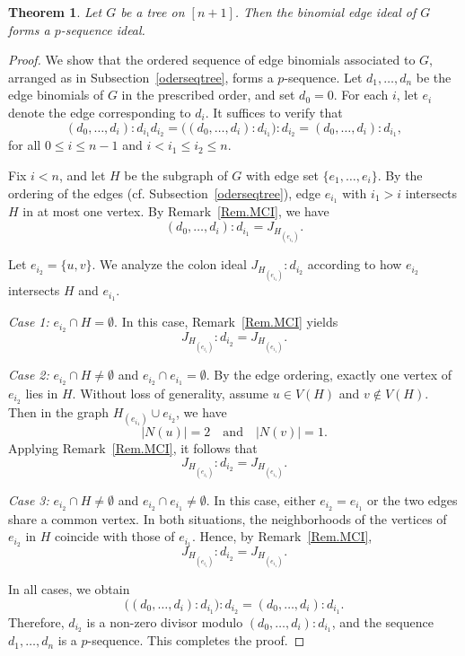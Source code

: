\documentclass[11pt,a4paper,reqno]{amsart}
\newtheorem{theorem}{Theorem}[section]
\theoremstyle{definition}
\begin{document}
\begin{theorem}\label{thm.pseqtree}
Let \(G\) be a tree on \([n+1]\). Then the binomial edge ideal of \(G\) forms a \(p\)-sequence ideal.
\end{theorem}

\begin{proof}
We show that the ordered sequence of edge binomials associated to \(G\), arranged as in Subsection~\ref{oderseqtree}, forms a \(p\)-sequence. Let \(d_1,\ldots,d_n\) be the edge binomials of \(G\) in the prescribed order, and set \(d_0=0\). For each \(i\), let \(e_i\) denote the edge corresponding to \(d_i\). It suffices to verify that
\[
(d_0,\ldots,d_i):d_{i_1}d_{i_2}
=
\big((d_0,\ldots,d_i):d_{i_1}\big):d_{i_2}
=
(d_0,\ldots,d_i):d_{i_1},
\]
for all \(0 \le i \le n-1\) and \(i < i_1 \le i_2 \le n\).

Fix \(i < n\), and let \(H\) be the subgraph of \(G\) with edge set \(\{e_1,\ldots,e_i\}\). By the ordering of the edges (cf. Subsection~\ref{oderseqtree}), edge \(e_{i_1}\) with \(i_1>i\) intersects \(H\) in at most one vertex. By Remark~\ref{Rem.MCI}, we have
\[
(d_0,\ldots,d_i):d_{i_1} = J_{H_{(e_{i_1})}}.
\]

Let \(e_{i_2}=\{u,v\}\). We analyze the colon ideal \(J_{H_{(e_{i_1})}}:d_{i_2}\) according to how \(e_{i_2}\) intersects \(H\) and \(e_{i_1}\).

\medskip

\noindent
\textit{Case 1:} \(e_{i_2} \cap H = \emptyset\).  
In this case, Remark~\ref{Rem.MCI} yields
\[
J_{H_{(e_{i_1})}}:d_{i_2} = J_{H_{(e_{i_1})}}.
\]

\medskip

\noindent
\textit{Case 2:} \(e_{i_2} \cap H \neq \emptyset\) and \(e_{i_2} \cap e_{i_1} = \emptyset\).  
By the edge ordering, exactly one vertex of \(e_{i_2}\) lies in \(H\). Without loss of generality, assume \(u \in V(H)\) and \(v \notin V(H)\). Then in the graph \(H_{(e_{i_1})} \cup e_{i_2}\), we have
\[
|N(u)| = 2 \quad \text{and} \quad |N(v)| = 1.
\]
Applying Remark~\ref{Rem.MCI}, it follows that
\[
J_{H_{(e_{i_1})}}:d_{i_2} = J_{H_{(e_{i_1})}}.
\]

\medskip

\noindent
\textit{Case 3:} \(e_{i_2} \cap H \neq \emptyset\) and \(e_{i_2} \cap e_{i_1} \neq \emptyset\).  
In this case, either \(e_{i_2}=e_{i_1}\) or the two edges share a common vertex. In both situations, the neighborhoods of the vertices of \(e_{i_2}\) in \(H\) coincide with those of \(e_{i_1}\). Hence, by Remark~\ref{Rem.MCI},
\[
J_{H_{(e_{i_1})}}:d_{i_2} = J_{H_{(e_{i_1})}}.
\]

\medskip

In all cases, we obtain
\[
\big((d_0,\ldots,d_i):d_{i_1}\big):d_{i_2}
=
(d_0,\ldots,d_i):d_{i_1}.
\]
Therefore, \(d_{i_2}\) is a non-zero divisor modulo \((d_0,\ldots,d_i):d_{i_1}\), and the sequence \(d_1,\ldots,d_n\) is a \(p\)-sequence. This completes the proof.
\end{proof}
\end{document}

